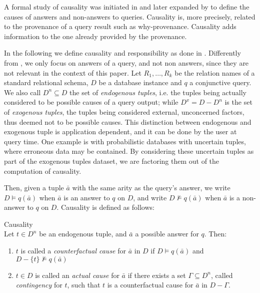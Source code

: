 \label{sec:responsibility}

A formal study of causality was initiated in \cite{Halpern2013Causality,ChocklerH04} and later expanded by \citet{MeliouGMS11} to define the causes of answers and non-answers to queries. Causality is, more precisely, related to the provenance of a query result such as why-provenance. Causality adds information to the one already provided by the provenance.

In the following we define causality and responsibility as done in \cite{MeliouGMS11}. Differently from \cite{MeliouGMS11}, we only focus on answers of a query, and not non answers, since they are not relevant in the context of this paper.
Let $R_1, \dots, R_k$ be the relation names of a standard relational schema, $D$ be a database instance and $q$ a conjunctive query. We also call $D^n \subseteq D$ the set of \emph{endogenous tuples}, i.e. the tuples being actually considered to be possible causes of a query output; while $D^x = D - D^n$ is the set of \emph{exogenous tuples}, the tuples being considered external, unconcerned factors, thus deemed not to be possible causes. 
This distinction between endogenous and exogenous tuple is application dependent, and it can be done by the user at query time. 
One example is with probabilistic databases with uncertain tuples, where erroneous data may be contained. By considering these uncertain tuples as part of the exogenous tuples dataset, we are factoring them out of the computation of causality. 

Then, given a tuple $\bar{a}$ with the same arity as the query's answer, we write $D \vDash q(\bar{a})$ when $\bar{a}$ is an answer to $q$ on $D$, and write $D \nvDash q(\bar{a})$ when $\bar{a}$ is a non-answer to $q$ on $D$.
Causality is defined as follows:

\begin{definition}{Causality \cite{MeliouGMS11} }\\
	Let $t \in D^n$ be an endogenous tuple, and $\bar{a}$ a possible answer for $q$. Then:
	\begin{enumerate}
		\item $t$ is called a \emph{counterfactual cause} for $\bar{a}$ in $D$ if $D \vDash q(\bar{a})$ and $D - \{t\} \nvDash q(\bar{a})$
		\item $t \in D$ is called an \emph{actual cause} for $\bar{a}$ if there exists a set $\Gamma \subseteq D^n$, called \emph{contingency} for $t$, such that $t$ is a counterfactual cause for $\bar{a}$ in $D - \Gamma$.
	\end{enumerate}
\end{definition}

